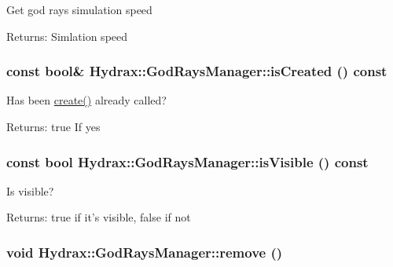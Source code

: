 \begin{CompactItemize}
Get god rays simulation speed \begin{Desc}
\item[Returns:]Simlation speed \end{Desc}
\hypertarget{class_hydrax_1_1_god_rays_manager_2843f0e85cd38ccd93c43698cfddae21}{
\subsubsection[{isCreated}]{\setlength{\rightskip}{0pt plus 5cm}const bool\& Hydrax::GodRaysManager::isCreated () const}}
\label{class_hydrax_1_1_god_rays_manager_2843f0e85cd38ccd93c43698cfddae21}


Has been \hyperlink{class_hydrax_1_1_god_rays_manager_d6e8cfa4b9bde36b668d04ae3cfe8d00}{create()} already called? \begin{Desc}
\item[Returns:]true If yes \end{Desc}
\hypertarget{class_hydrax_1_1_god_rays_manager_b58ff59d51808f29ad9108870200d264}{
\subsubsection[{isVisible}]{\setlength{\rightskip}{0pt plus 5cm}const bool Hydrax::GodRaysManager::isVisible () const}}
\label{class_hydrax_1_1_god_rays_manager_b58ff59d51808f29ad9108870200d264}


Is visible? \begin{Desc}
\item[Returns:]true if it's visible, false if not \end{Desc}
\hypertarget{class_hydrax_1_1_god_rays_manager_c4f9cdb2271b323d518c7bc84e3bf2da}{
\subsubsection[{remove}]{\setlength{\rightskip}{0pt plus 5cm}void Hydrax::GodRaysManager::remove ()}}
\label{class_hydrax_1_1_god_rays_manager_c4f9cdb2271b323d518c7bc84e3bf2da}



\end{CompactItemize}

